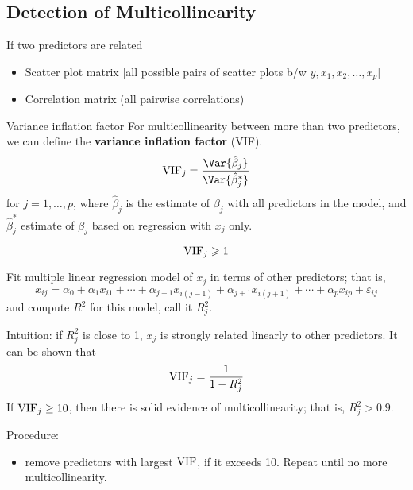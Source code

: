 \subsection{Detection of Multicollinearity}
If two predictors are related
\begin{itemize}
    \item Scatter plot matrix [all possible pairs of
                  scatter plots b/w $ y,x_1,x_2,\ldots,x_p $]
    \item Correlation matrix (all pairwise correlations)
\end{itemize}
\begin{Definition}{Variance inflation factor}{}
    For multicollinearity between more than two
    predictors, we can define the \textbf{variance inflation factor}
    (VIF).
    \[ \VIF_j=\frac{\Var{\hat{\beta}_j}}{\Var{\hat{\beta}_j^*}} \]
    for $ j=1,\ldots,p $,
    where $ \hat{\beta}_j $ is the estimate of $ \beta_j $ with all predictors
    in the model, and $ \hat{\beta}_j^* $ estimate
    of $ \beta_j $ based on regression with $ x_j $ only.
\end{Definition}
\begin{Theorem}{}{}
    \[ \operatorname{VIF}_j\geqslant 1 \]

\end{Theorem}
Fit multiple linear regression model of $ x_j $ in terms of other predictors;
that is,
\[ x_{i j}=\alpha_0+\alpha_1x_{i1}+\cdots+\alpha_{j-1}x_{i(j-1)}+
    \alpha_{j+1}x_{i(j+1)}+\cdots+\alpha_p x_{i p}+\varepsilon_{ij} \]
and compute $ R^2 $ for this model, call it $ R_j^2 $.

Intuition: if $ R_j^2 $ is close to 1, $ x_j $ is strongly
related linearly to other predictors. It can be shown that
\[ \operatorname{VIF}_j=\frac{1}{1-R_j^2}  \]
If $ \operatorname{VIF}_j\ge 10 $, then there is solid evidence of multicollinearity;
that is, $ R_j^2>0.9 $.

Procedure:
\begin{itemize}
    \item remove predictors with largest $ \operatorname{VIF} $, if it exceeds 10.
          Repeat until no more multicollinearity.
\end{itemize}

